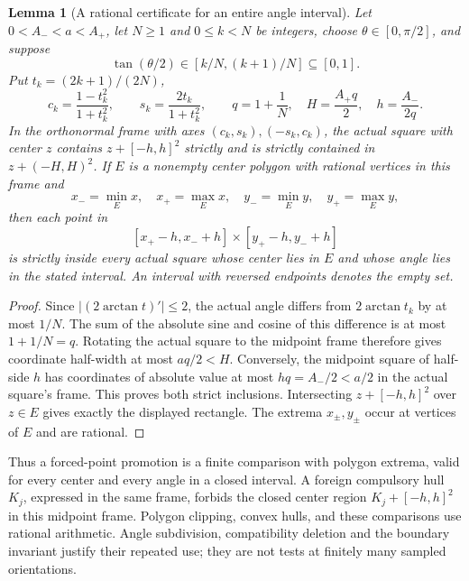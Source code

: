 \documentclass[11pt]{article}
\newtheorem{lemma}[theorem]{Lemma}
\begin{document}
\begin{lemma}[A rational certificate for an entire angle interval]
\label{lem:rational-pose-bin}
Let $0<A_-<a<A_+$, let $N\ge1$ and $0\le k<N$ be integers,
choose $\theta\in[0,\pi/2]$, and suppose
\[
 \tan(\theta/2)\in[k/N,(k+1)/N]\subseteq[0,1].
\]
Put $t_k=(2k+1)/(2N)$,
\[
 c_k=\frac{1-t_k^2}{1+t_k^2},\qquad
 s_k=\frac{2t_k}{1+t_k^2},\qquad
 q=1+\frac1N,\quad H=\frac{A_+q}{2},\quad h=\frac{A_-}{2q}.
\]
In the orthonormal frame with axes $(c_k,s_k),(-s_k,c_k)$,
the actual square with center $z$ contains $z+[-h,h]^2$ strictly and
is strictly contained in $z+(-H,H)^2$.
If $E$ is a nonempty center polygon with rational vertices in this frame and
\[
 x_-=\min_E x,\quad x_+=\max_E x,\quad
 y_-=\min_E y,\quad y_+=\max_E y,
\]
then each point in
\[
 [x_+-h,x_-+h]\times[y_+-h,y_-+h]
\]
is strictly inside every actual square whose center lies in $E$ and
whose angle lies in the stated interval. An interval with reversed
endpoints denotes the empty set.
\end{lemma}
\begin{proof}
Since $|(2\arctan t)'|\le2$, the actual angle differs from
$2\arctan t_k$ by at most $1/N$. The sum of the absolute sine and
cosine of this difference is at most $1+1/N=q$. Rotating the actual
square to the midpoint frame therefore gives coordinate half-width
at most $aq/2<H$. Conversely, the midpoint square of half-side $h$
has coordinates of absolute value at most $hq=A_-/2<a/2$ in the
actual square's frame. This proves both strict inclusions. Intersecting
$z+[-h,h]^2$ over $z\in E$ gives exactly the displayed rectangle.
The extrema $x_\pm,y_\pm$ occur at vertices of $E$ and are rational.
\end{proof}

Thus a forced-point promotion is a finite comparison with polygon
extrema, valid for every center and every angle in a closed interval.
A foreign compulsory hull $K_j$, expressed in the same frame, forbids the closed center region
$K_j+[-h,h]^2$ in this midpoint frame. Polygon clipping, convex hulls,
and these comparisons use rational arithmetic. Angle subdivision,
compatibility deletion and the boundary invariant justify their repeated
use; they are not tests at finitely many sampled orientations.
\end{document}

